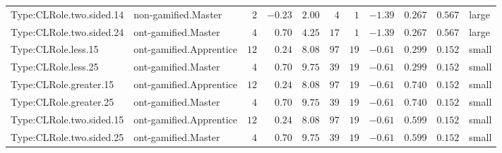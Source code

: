 \documentclass[6pt,a4paper]{article}
\begin{document}
{\begin{longtable}{llrrrrrrrrl}
Type:CLRole.two.sided.14&non-gamified.Master&$ 2$&$-0.23$&$ 2.00$&$  4$&$ 1$&$-1.39$&$0.267$&$0.567$&large\tabularnewline
Type:CLRole.two.sided.24&ont-gamified.Master&$ 4$&$ 0.70$&$ 4.25$&$ 17$&$ 1$&$-1.39$&$0.267$&$0.567$&large\tabularnewline
Type:CLRole.less.15&ont-gamified.Apprentice&$12$&$ 0.24$&$ 8.08$&$ 97$&$19$&$-0.61$&$0.299$&$0.152$&small\tabularnewline
Type:CLRole.less.25&ont-gamified.Master&$ 4$&$ 0.70$&$ 9.75$&$ 39$&$19$&$-0.61$&$0.299$&$0.152$&small\tabularnewline
Type:CLRole.greater.15&ont-gamified.Apprentice&$12$&$ 0.24$&$ 8.08$&$ 97$&$19$&$-0.61$&$0.740$&$0.152$&small\tabularnewline
Type:CLRole.greater.25&ont-gamified.Master&$ 4$&$ 0.70$&$ 9.75$&$ 39$&$19$&$-0.61$&$0.740$&$0.152$&small\tabularnewline
\newpage
Type:CLRole.two.sided.15&ont-gamified.Apprentice&$12$&$ 0.24$&$ 8.08$&$ 97$&$19$&$-0.61$&$0.599$&$0.152$&small\tabularnewline
Type:CLRole.two.sided.25&ont-gamified.Master&$ 4$&$ 0.70$&$ 9.75$&$ 39$&$19$&$-0.61$&$0.599$&$0.152$&small\tabularnewline
\hline
\end{longtable}}
\end{document}
